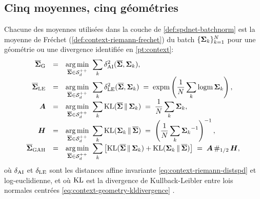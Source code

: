 \subsection{Cinq moyennes, cinq géométries}
\label{sec:spdnet-batchnorm-moyennes}

\begin{proposition}
\label{prop:spdnet-moyennes-frechet}
  Chacune des moyennes utilisées dans la couche de \cref{def:spdnet-batchnorm}
  est la moyenne de Fréchet (\cref{def:context-riemann-frechet}) du batch
  $\{\boldsymbol{\Sigma}_k\}_{k=1}^{N}$ pour une géométrie ou une divergence
  identifiée en \cref{pt:context}:
  \begin{equation}
    \begin{array}{rcl}
      \Fmean_{\meanlabel{G}}
        &=& \displaystyle\argmin_{\Fmean\in\SPD{\Nvar}}\ \sum_{\iobs}\geodist^2_{\meanlabel{AI}}(\Fmean,\MCov_\iobs),
        \\[10pt]
      \Fmean_{\meanlabel{LE}}
        &=& \displaystyle\argmin_{\Fmean\in\SPD{\Nvar}}\ \sum_{\iobs}\geodist^2_{\meanlabel{LE}}(\Fmean,\MCov_\iobs)
        \;=\; \expm\left(\frac{1}{\Nobs}\sum_{\iobs}\logm\MCov_\iobs\right),
        \\[10pt]
      \meanari
        &=& \displaystyle\argmin_{\Fmean\in\SPD{\Nvar}}\ \sum_{\iobs}\KL(\Fmean\,\|\,\MCov_\iobs)
        \;=\; \frac{1}{\Nobs}\sum_{\iobs}\MCov_\iobs,
        \\[10pt]
      \meanharm
        &=& \displaystyle\argmin_{\Fmean\in\SPD{\Nvar}}\ \sum_{\iobs}\KL(\MCov_\iobs\,\|\,\Fmean)
        \;=\; \left(\frac{1}{\Nobs}\sum_{\iobs}\inv{\MCov_\iobs}\right)^{-1},
        \\[10pt]
      \Fmean_{\meanlabel{GAH}}
        &=& \displaystyle\argmin_{\Fmean\in\SPD{\Nvar}}\ \sum_{\iobs}\left[\KL(\Fmean\,\|\,\MCov_\iobs)+\KL(\MCov_\iobs\,\|\,\Fmean)\right]
        \;=\; \meanari\,\geodmean_{1/2}\,\meanharm,
    \end{array}
    \label{eq:spdnet-moyennes-frechet}
  \end{equation}
  où $\delta_{\mathrm{AI}}$ et $\delta_{\mathrm{LE}}$ sont les distances
  affine invariante \cref{eq:context-riemann-distspd} et log-euclidienne, et où
  $\mathrm{KL}$ est la divergence de Kullback-Leibler entre lois normales centrées
  \cref{eq:context-geometry-kldivergence}
  .
\end{proposition}

